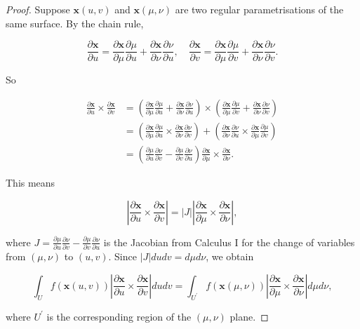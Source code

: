 \begin{proof}
  Suppose \(\boldsymbol{x}(u, v)\) and \(\boldsymbol{x}(\mu, \nu)\) are two regular parametrisations of the same surface. By the chain rule,

\[
\frac{\partial \boldsymbol{x}}{\partial u}=\frac{\partial \boldsymbol{x}}{\partial \mu} \frac{\partial \mu}{\partial u}+\frac{\partial \boldsymbol{x}}{\partial \nu} \frac{\partial \nu}{\partial u}, \quad \frac{\partial \boldsymbol{x}}{\partial v}=\frac{\partial \boldsymbol{x}}{\partial \mu} \frac{\partial \mu}{\partial v}+\frac{\partial \boldsymbol{x}}{\partial \nu} \frac{\partial \nu}{\partial v} .
\]

So

\[
\begin{aligned}
\frac{\partial \boldsymbol{x}}{\partial u} \times \frac{\partial \boldsymbol{x}}{\partial v} & =\left(\frac{\partial \boldsymbol{x}}{\partial \mu} \frac{\partial \mu}{\partial u}+\frac{\partial \boldsymbol{x}}{\partial \nu} \frac{\partial \nu}{\partial u}\right) \times\left(\frac{\partial \boldsymbol{x}}{\partial \mu} \frac{\partial \mu}{\partial v}+\frac{\partial \boldsymbol{x}}{\partial \nu} \frac{\partial \nu}{\partial v}\right) \\
& =\left(\frac{\partial \boldsymbol{x}}{\partial \mu} \frac{\partial \mu}{\partial u} \times \frac{\partial \boldsymbol{x}}{\partial \nu} \frac{\partial \nu}{\partial v}\right)+\left(\frac{\partial \boldsymbol{x}}{\partial \nu} \frac{\partial \nu}{\partial u} \times \frac{\partial \boldsymbol{x}}{\partial \mu} \frac{\partial \mu}{\partial v}\right) \\
& =\left(\frac{\partial \mu}{\partial u} \frac{\partial \nu}{\partial v}-\frac{\partial \mu}{\partial v} \frac{\partial \nu}{\partial u}\right) \frac{\partial \boldsymbol{x}}{\partial \mu} \times \frac{\partial \boldsymbol{x}}{\partial \nu} .
\end{aligned}
\]

This means

\[
\left|\frac{\partial \boldsymbol{x}}{\partial u} \times \frac{\partial \boldsymbol{x}}{\partial v}\right|=|J|\left|\frac{\partial \boldsymbol{x}}{\partial \mu} \times \frac{\partial \boldsymbol{x}}{\partial \nu}\right|,
\]

where \(J=\frac{\partial \mu}{\partial u} \frac{\partial \nu}{\partial v}-\frac{\partial \mu}{\partial v} \frac{\partial \nu}{\partial u}\) is the Jacobian from Calculus I for the change of variables from \((\mu, \nu)\) to \((u, v)\). Since \(|J| d u d v=d \mu d \nu\), we obtain

\[
\int_U f(\boldsymbol{x}(u, v))\left|\frac{\partial \boldsymbol{x}}{\partial u} \times \frac{\partial \boldsymbol{x}}{\partial v}\right| d u d v=\int_{U^{\prime}} f(\boldsymbol{x}(\mu, \nu))\left|\frac{\partial \boldsymbol{x}}{\partial \mu} \times \frac{\partial \boldsymbol{x}}{\partial \nu}\right| d \mu d \nu,
\]

where \(U^{\prime}\) is the corresponding region of the \((\mu, \nu)\) plane.
\end{proof}


